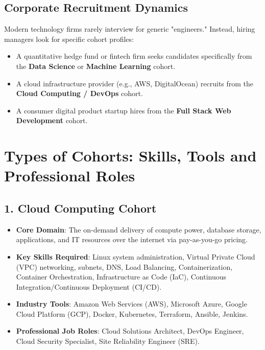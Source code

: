 \subsection{Corporate Recruitment Dynamics}
Modern technology firms rarely interview for generic "engineers." Instead, hiring managers look for specific cohort profiles:
\begin{itemize}
    \item A quantitative hedge fund or fintech firm seeks candidates specifically from the \textbf{Data Science} or \textbf{Machine Learning} cohort.
    \item A cloud infrastructure provider (e.g., AWS, DigitalOcean) recruits from the \textbf{Cloud Computing / DevOps} cohort.
    \item A consumer digital product startup hires from the \textbf{Full Stack Web Development} cohort.
\end{itemize}

\section{Types of Cohorts: Skills, Tools and Professional Roles}

\subsection{1. Cloud Computing Cohort}
\begin{itemize}[leftmargin=1.5em]
    \item \textbf{Core Domain}: The on-demand delivery of compute power, database storage, applications, and IT resources over the internet via pay-as-you-go pricing.
    \item \textbf{Key Skills Required}: Linux system administration, Virtual Private Cloud (VPC) networking, subnets, DNS, Load Balancing, Containerization, Container Orchestration, Infrastructure as Code (IaC), Continuous Integration/Continuous Deployment (CI/CD).
    \item \textbf{Industry Tools}: Amazon Web Services (AWS), Microsoft Azure, Google Cloud Platform (GCP), Docker, Kubernetes, Terraform, Ansible, Jenkins.
    \item \textbf{Professional Job Roles}: Cloud Solutions Architect, DevOps Engineer, Cloud Security Specialist, Site Reliability Engineer (SRE).
\end{itemize}

